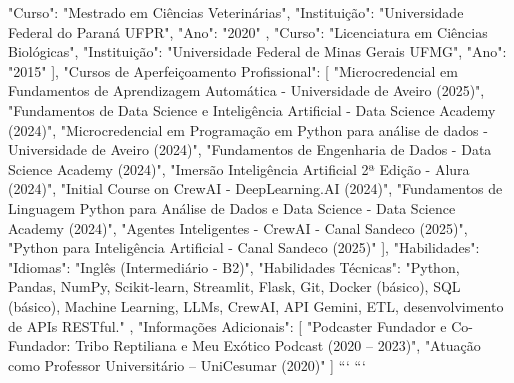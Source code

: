 {{      {
        "Curso": "Mestrado em Ciências Veterinárias",
        "Instituição": "Universidade Federal do Paraná UFPR",
        "Ano": "2020"
      },
      {
        "Curso": "Licenciatura em Ciências Biológicas",
        "Instituição": "Universidade Federal de Minas Gerais UFMG",
        "Ano": "2015"
      }
    ],
    "Cursos de Aperfeiçoamento Profissional": [
      "Microcredencial em Fundamentos de Aprendizagem Automática - Universidade de Aveiro (2025)",
      "Fundamentos de Data Science e Inteligência Artificial - Data Science Academy (2024)",
      "Microcredencial em Programação em Python para análise de dados - Universidade de Aveiro (2024)",
      "Fundamentos de Engenharia de Dados - Data Science Academy (2024)",
      "Imersão Inteligência Artificial 2ª Edição - Alura (2024)",
      "Initial Course on CrewAI - DeepLearning.AI (2024)",
      "Fundamentos de Linguagem Python para Análise de Dados e Data Science - Data Science Academy (2024)",
      "Agentes Inteligentes - CrewAI - Canal Sandeco (2025)",
      "Python para Inteligência Artificial - Canal Sandeco (2025)"
    ],
    "Habilidades": {
      "Idiomas": "Inglês (Intermediário - B2)",
      "Habilidades Técnicas": "Python, Pandas, NumPy, Scikit-learn, Streamlit, Flask, Git, Docker (básico), SQL (básico), Machine Learning, LLMs, CrewAI, API Gemini, ETL, desenvolvimento de APIs RESTful."
    },
    "Informações Adicionais": [
      "Podcaster Fundador e Co-Fundador: Tribo Reptiliana e Meu Exótico Podcast (2020 – 2023)",
      "Atuação como Professor Universitário – UniCesumar (2020)"
    ]
  }
}
```
```